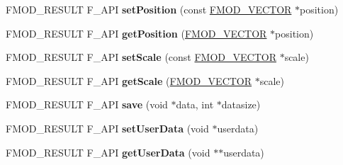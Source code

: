 \begin{DoxyCompactItemize}
\item 
\hypertarget{class_f_m_o_d_1_1_geometry_a36ca90c62cbc0c37938a51750ce865e7}{F\+M\+O\+D\+\_\+\+R\+E\+S\+U\+L\+T F\+\_\+\+A\+P\+I {\bfseries set\+Position} (const \hyperlink{struct_f_m_o_d___v_e_c_t_o_r}{F\+M\+O\+D\+\_\+\+V\+E\+C\+T\+O\+R} $\ast$position)}\label{class_f_m_o_d_1_1_geometry_a36ca90c62cbc0c37938a51750ce865e7}

\item 
\hypertarget{class_f_m_o_d_1_1_geometry_a2d0e4a6525b54cd9a39c447995eba296}{F\+M\+O\+D\+\_\+\+R\+E\+S\+U\+L\+T F\+\_\+\+A\+P\+I {\bfseries get\+Position} (\hyperlink{struct_f_m_o_d___v_e_c_t_o_r}{F\+M\+O\+D\+\_\+\+V\+E\+C\+T\+O\+R} $\ast$position)}\label{class_f_m_o_d_1_1_geometry_a2d0e4a6525b54cd9a39c447995eba296}

\item 
\hypertarget{class_f_m_o_d_1_1_geometry_a46104dceeff4a02e5aae989f86951b2f}{F\+M\+O\+D\+\_\+\+R\+E\+S\+U\+L\+T F\+\_\+\+A\+P\+I {\bfseries set\+Scale} (const \hyperlink{struct_f_m_o_d___v_e_c_t_o_r}{F\+M\+O\+D\+\_\+\+V\+E\+C\+T\+O\+R} $\ast$scale)}\label{class_f_m_o_d_1_1_geometry_a46104dceeff4a02e5aae989f86951b2f}

\item 
\hypertarget{class_f_m_o_d_1_1_geometry_a40f45f30258de49daf8bee7063afa9e9}{F\+M\+O\+D\+\_\+\+R\+E\+S\+U\+L\+T F\+\_\+\+A\+P\+I {\bfseries get\+Scale} (\hyperlink{struct_f_m_o_d___v_e_c_t_o_r}{F\+M\+O\+D\+\_\+\+V\+E\+C\+T\+O\+R} $\ast$scale)}\label{class_f_m_o_d_1_1_geometry_a40f45f30258de49daf8bee7063afa9e9}

\item 
\hypertarget{class_f_m_o_d_1_1_geometry_a066a05c012e2d41f1ca929ab0328aa25}{F\+M\+O\+D\+\_\+\+R\+E\+S\+U\+L\+T F\+\_\+\+A\+P\+I {\bfseries save} (void $\ast$data, int $\ast$datasize)}\label{class_f_m_o_d_1_1_geometry_a066a05c012e2d41f1ca929ab0328aa25}

\item 
\hypertarget{class_f_m_o_d_1_1_geometry_a9e7359878a030cf144cfdd773dfce85a}{F\+M\+O\+D\+\_\+\+R\+E\+S\+U\+L\+T F\+\_\+\+A\+P\+I {\bfseries set\+User\+Data} (void $\ast$userdata)}\label{class_f_m_o_d_1_1_geometry_a9e7359878a030cf144cfdd773dfce85a}

\item 
\hypertarget{class_f_m_o_d_1_1_geometry_ab8502126a540d836f0fee179f2310c8f}{F\+M\+O\+D\+\_\+\+R\+E\+S\+U\+L\+T F\+\_\+\+A\+P\+I {\bfseries get\+User\+Data} (void $\ast$$\ast$userdata)}\label{class_f_m_o_d_1_1_geometry_ab8502126a540d836f0fee179f2310c8f}


\end{DoxyCompactItemize}
